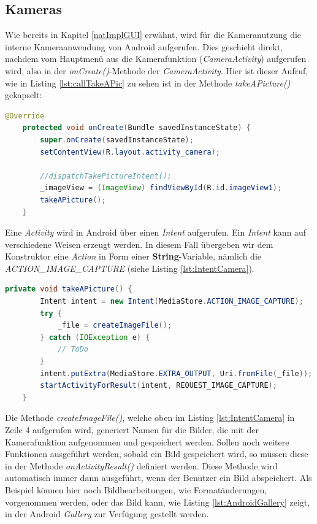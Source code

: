 \subsection*{Kameras}

Wie bereits in Kapitel \ref{natImplGUI} erwähnt, wird für die Kameranutzung die interne Kameraanwendung von Android aufgerufen. Dies geschieht direkt, nachdem vom Hauptmenü aus die Kamerafunktion (\textit{CameraActivity}) aufgerufen wird, also in der \textit{onCreate()}-Methode der \textit{CameraActivity}. Hier ist dieser Aufruf, wie in Listing \ref{lst:callTakeAPic} zu sehen ist in der Methode \textit{takeAPicture()} gekapselt:

\begin{lstlisting}[caption=Aufruf der Android-Kamerafunktion in der \textit{onCreate()}-Methode der Klasse \textit{CameraActivity}, label=lst:callTakeAPic, language=Java]
@Override
    protected void onCreate(Bundle savedInstanceState) {
        super.onCreate(savedInstanceState);
        setContentView(R.layout.activity_camera);

        //dispatchTakePictureIntent();
        _imageView = (ImageView) findViewById(R.id.imageView1);
        takeAPicture();
    }
\end{lstlisting}  

Eine \textit{Activity} wird in Android über einen \textit{Intent} aufgerufen. Ein \textit{Intent} kann auf verschiedene Weisen erzeugt werden. In diesem Fall übergeben wir dem Konstruktor eine \textit{Action} in Form einer \textbf{String}-Variable, nämlich die \textit{ACTION\_IMAGE\_CAPTURE} (siehe Listing \ref{lst:IntentCamera}).
\clearpage

\begin{lstlisting}[caption=Methode \textit{takeAPicture()}: Aufruf der Android-Kamerafunktion über einen \textit{Intent}, label=lst:IntentCamera, language=Java]
private void takeAPicture() {
        Intent intent = new Intent(MediaStore.ACTION_IMAGE_CAPTURE);
        try {
            _file = createImageFile();
        } catch (IOException e) {
            // ToDo
        }
        intent.putExtra(MediaStore.EXTRA_OUTPUT, Uri.fromFile(_file));
        startActivityForResult(intent, REQUEST_IMAGE_CAPTURE);
    }
\end{lstlisting}  

Die Methode \textit{createImageFile()}, welche oben im Listing \ref{lst:IntentCamera} in Zeile 4 aufgerufen wird, generiert Namen für die Bilder, die mit der Kamerafunktion aufgenommen und gespeichert werden. Sollen noch weitere Funktionen ausgeführt werden, sobald ein Bild gespeichert wird, so müssen diese in der Methode \textit{onActivityResult()} definiert werden. Diese Methode wird automatisch immer dann ausgeführt, wenn der Benutzer ein Bild abspeichert. Als Beispiel können hier noch Bildbearbeitungen, wie Formatänderungen, vorgenommen werden, oder das Bild kann, wie Listing \ref{lst:AndroidGallery} zeigt, in der Android \textit{Gallery} zur Verfügung gestellt werden.

